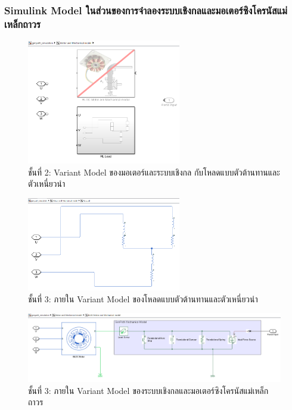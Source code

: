 \documentclass[11pt,a4paper]{article}
\begin{document}
\subsubsection{Simulink Model ในส่วนของการจำลองระบบเชิงกลและมอเตอร์ซิงโครนัสแม่เหล็กถาวร}

\begin{figure}[H]
    \centering
    \includegraphics[width=0.6\textwidth]{l1-mechmodel.png}
    \caption{ชั้นที่ 2: Variant Model ของมอเตอร์และระบบเชิงกล กับโหลดแบบตัวต้านทานและตัวเหนี่ยวนำ}
\end{figure}

\begin{figure}[H]
    \centering
    \includegraphics[width=0.6\textwidth]{l2-rlload.png}
    \caption{ชั้นที่ 3: ภายใน Variant Model ของโหลดแบบตัวต้านทานและตัวเหนี่ยวนำ}
\end{figure}

\begin{figure}[H]
    \centering
    \includegraphics[width=\textwidth]{l4-genpath-bldc.png}
    \caption{ชั้นที่ 3: ภายใน Variant Model ของระบบเชิงกลและมอเตอร์ซิงโครนัสแม่เหล็กถาวร}
\end{figure}
\end{document}
